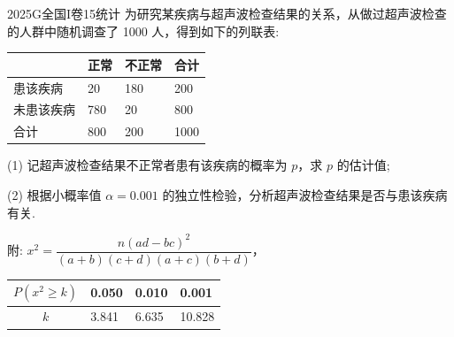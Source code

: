 
\begin{problem}{2025}{G}{全国I卷}{15}{统计}
为研究某疾病与超声波检查结果的关系，从做过超声波检查的人群中随机调查了 1000 人，得到如下的列联表:
\begin{center}
\begin{tabular}{|l|l|l|l|}
\hline
 & 正常 & 不正常 & 合计 \\
\hline
患该疾病 & 20 & 180 & 200 \\
\hline
未患该疾病 & 780 & 20 & 800 \\
\hline
合计 & 800 & 200 & 1000 \\
\hline
\end{tabular}
\end{center}
(1) 记超声波检查结果不正常者患有该疾病的概率为 $p$，求 $p$ 的估计值;

(2) 根据小概率值 $\alpha=0.001$ 的独立性检验，分析超声波检查结果是否与患该疾病有关.

附: $x^2 = \dfrac{n(ad-bc)^2}{(a+b)(c+d)(a+c)(b+d)}$，
\begin{tabular}{|c|l|l|l|}
\hline
$P(x^2 \geqslant k)$ & 0.050 & 0.010 & 0.001 \\
\hline
$k$ & 3.841 & 6.635 & 10.828 \\
\hline
\end{tabular}
\end{problem}